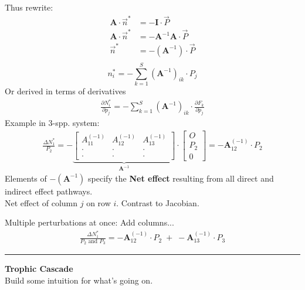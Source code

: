 \documentclass{article}
\newcommand{\note}[1]{\colorbox{gray!30}{#1}}
\newcommand{\ind}{\-\hspace{1cm}}
\begin{document}
Thus rewrite:
\begin{align*}
	\mathbf{A}\cdot \vec{n}^*&=-\mathbf{I}\cdot \vec{P}\\
	\mathbf{A}\cdot \vec{n}^*&=-\mathbf{A}^{-1}\mathbf{A}\cdot \vec{P}\\
	 \vec{n}^*&=-(\mathbf{A}^{-1})\cdot \vec{P}\\
\end{align*}
\begin{equation*}
	n_i^* = -\sum_{k=1}^S(\mathbf{A}^{-1})_{ik}\cdot P_j
\end{equation*}
Or derived in terms of derivatives
\begin{align*}
	\frac{\partial N_i^*}{\partial p_j}=-\sum_{k=1}^S(\mathbf{A}^{-1})_{ik}\cdot \frac{\partial F_k}{\partial p_j}
\end{align*}
Example in 3-spp. system:
\begin{align*}
	\frac{\Delta N_1^*}{P_2}=-\underbrace{\begin{bmatrix} A_{11}^{(-1)} & A_{12}^{(-1)} & A_{13}^{(-1)} \\ \cdot & \cdot & \cdot   \\ \cdot & \cdot & \cdot \end{bmatrix}}_{\mathbf{A}^{-1}} \cdot \begin{bmatrix} O \\ P_2 \\ 0 \end{bmatrix} = -\mathbf{A}_{12}^{(-1)} \cdot P_2
\end{align*}
Elements of $-(\mathbf{A}^{-1})$ specify the \textbf{Net effect} resulting from all direct and indirect effect pathways.\\
\ind Net effect of column $j$ on row $i$. \note{Contrast to Jacobian.}

Multiple perturbations at once:  Add columns...
\begin{align*}
	 \frac{\Delta N_1^*}{P_2 \text{ and } P_3}=  -\mathbf{A}_{12}^{(-1)} \cdot P_2 \; + \; -\mathbf{A}_{13}^{(-1)} \cdot P_3
\end{align*}

\rule[0.5ex]{\linewidth}{1pt}
\textbf{Trophic Cascade}\\
\ind Build some intuition for what's going on.\\
\end{document}
